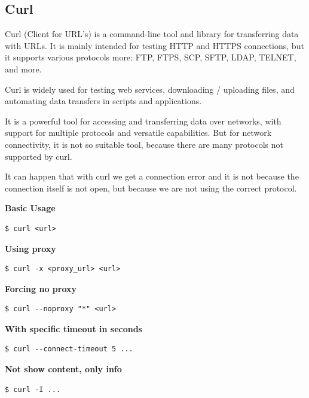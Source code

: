 \documentclass{article}
\newenvironment{codetemplate}[1][]{%
  \mybasecolorbox[#1]
  \itshape
}{%
  \endmybasecolorbox
}
\begin{document}
\subsection{Curl}

Curl (Client for URL's) is a command-line tool and library for transferring data with URLs. It is mainly intended for testing HTTP and HTTPS connections, but it supports various protocols more: FTP, FTPS, SCP, SFTP, LDAP, TELNET, and more. 

Curl is widely used for testing web services, downloading / uploading files, and automating data transfers in scripts and applications. 

It is a powerful tool for accessing and transferring data over networks, with support for multiple protocols and versatile capabilities. But for network connectivity, it is not so suitable tool, because there are many protocols not supported by curl. 

It can happen that with curl we get a connection error and it is not because the connection itself is not open, but because we are not using the correct protocol.

\textbf{Basic Usage}
\begin{codetemplate}{}
\begin{verbatim}
$ curl <url> 
\end{verbatim}
\end{codetemplate}

\textbf{Using proxy}
\begin{codetemplate}{}
\begin{verbatim}
$ curl -x <proxy_url> <url> 
\end{verbatim}
\end{codetemplate}

\textbf{Forcing no proxy}
\begin{codetemplate}{}
\begin{verbatim}
$ curl --noproxy "*" <url>
\end{verbatim}
\end{codetemplate}


\textbf{With specific timeout in seconds}
\begin{codetemplate}{}
\begin{verbatim}
$ curl --connect-timeout 5 ...
\end{verbatim}
\end{codetemplate}

\textbf{Not show content, only info}
\begin{codetemplate}{}
\begin{verbatim}
$ curl -I ...
\end{verbatim}
\end{codetemplate}
\end{document}
